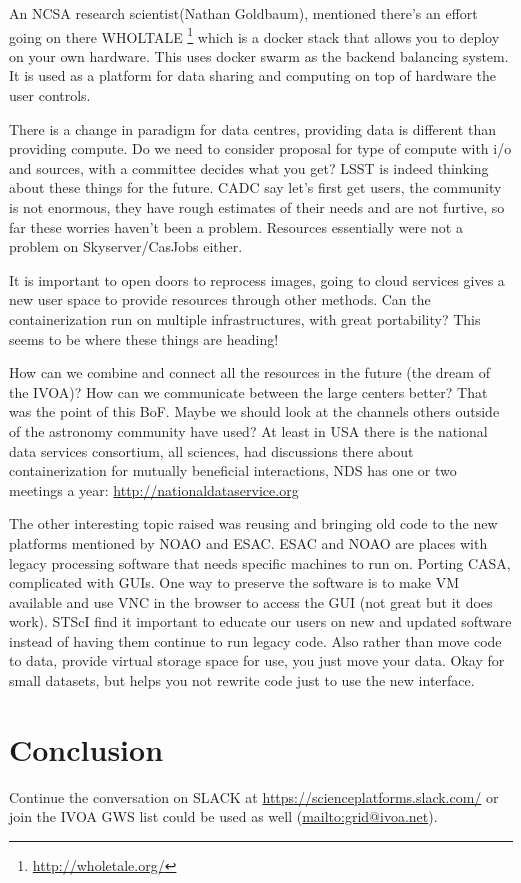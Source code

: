 \documentclass[11pt,twoside]{article}
\begin{document}
An NCSA research scientist(Nathan Goldbaum), mentioned there's an effort going on there WHOLTALE \footnote{\url{http://wholetale.org/}}  which is a docker stack that allows you to deploy on your own hardware. This uses docker swarm as the backend balancing system. It is used as a platform for data sharing and computing on top of hardware the user controls.

There is a change in paradigm for data centres, providing data is different than providing compute. Do we need to consider proposal for type of compute with i/o and sources, with a committee  decides what you get?
	 LSST is indeed thinking about these things for the future.
	 CADC say let's first get users, the community is not enormous, they have rough estimates of their needs and are not furtive, so far these worries haven't been a problem. Resources essentially were not a problem on Skyserver/CasJobs either.

It is important to open doors to reprocess images, going to cloud services gives a new user space to provide resources through other methods. Can the containerization run on multiple infrastructures, with great portability?
This seems to be where these things are heading!


How can we combine and connect all the resources in the future (the dream of the IVOA)?
How can we communicate between the large centers better?
That was the point of this BoF.
Maybe we should look at the channels others outside of the astronomy community have used?
At least in USA there is the  national data services consortium, all sciences, had discussions there about containerization for mutually beneficial interactions, NDS has one or two meetings a year: \url{http://nationaldataservice.org}


The other interesting topic raised was  reusing and bringing old code to the new platforms mentioned by NOAO and ESAC.
ESAC and NOAO are places with legacy processing software that needs specific machines to run on.
Porting CASA, complicated with GUIs.
One way to preserve the software is to make  VM  available and use VNC in the browser to access the GUI (not great but it does work).
STScI find it  important to educate our users on new and updated software instead of having them continue to run legacy code.
Also rather than move code to data, provide virtual storage space for use, you just move your data. Okay for small datasets, but helps you not rewrite code just to use the new interface.




\section{Conclusion}
Continue the conversation on SLACK at \url{https://scienceplatforms.slack.com/} or join the IVOA GWS list could be used as well (\url{mailto:grid@ivoa.net}).

\end{document}
